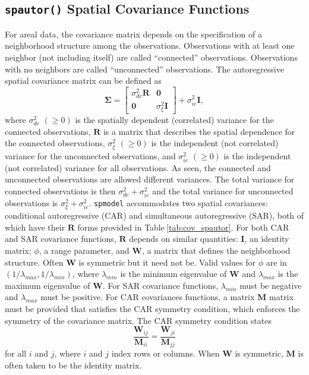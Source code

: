 \documentclass{article}
\begin{document}
\hypertarget{spautor-spatial-covariance-functions}{%
\subsection{\texorpdfstring{\texttt{spautor()} Spatial Covariance
Functions}{spautor() Spatial Covariance Functions}}\label{spautor-spatial-covariance-functions}}

For areal data, the covariance matrix depends on the specification of a
neighborhood structure among the observations. Observations with at
least one neighbor (not including itself) are called ``connected''
observations. Observations with no neighbors are called ``unconnected''
observations. The autoregressive spatial covariance matrix can be
defined as \begin{equation*}
  \boldsymbol{\Sigma} =
  \begin{bmatrix}
    \sigma^2_{de} \mathbf{R} & \mathbf{0} \\
    \mathbf{0} & \sigma^2_{\xi} \mathbf{I}
  \end{bmatrix}
  + \sigma^2_{ie} \mathbf{I},
\end{equation*} where \(\sigma^2_{de}\) \((\geq 0)\) is the spatially
dependent (correlated) variance for the connected observations,
\(\mathbf{R}\) is a matrix that describes the spatial dependence for the
connected observations, \(\sigma^2_{\xi}\) \((\geq 0)\) is the
independent (not correlated) variance for the unconnected observations,
and \(\sigma^2_{ie}\) \((\geq 0)\) is the independent (not correlated)
variance for all observations. As seen, the connected and unconnected
observations are allowed different variances. The total variance for
connected observations is then \(\sigma^2_{de} + \sigma^2_{ie}\) and the
total variance for unconnected observations is
\(\sigma^2_{\xi} + \sigma^2_{ie}\). \texttt{spmodel} accommodates two
spatial covariances: conditional autoregressive (CAR) and simultaneous
autoregressive (SAR), both of which have their \(\mathbf{R}\) forms
provided in Table\(~\)\ref{tab:cov_spautor}. For both CAR and SAR
covariance functions, \(\mathbf{R}\) depends on similar quantities:
\(\mathbf{I}\), an identity matrix; \(\phi\), a range parameter, and
\(\mathbf{W}\), a matrix that defines the neighborhood structure. Often
\(\mathbf{W}\) is symmetric but it need not be. Valid values for
\(\phi\) are in \((1 / \lambda_{max}, 1 / \lambda_{min})\), where
\(\lambda_{min}\) is the minimum eigenvalue of \(\mathbf{W}\) and
\(\lambda_{max}\) is the maximum eigenvalue of \(\mathbf{W}\). For SAR
covariance functions, \(\lambda_{min}\) must be negative and
\(\lambda_{max}\) must be positive. For CAR covariances functions, a
matrix \(\mathbf{M}\) matrix must be provided that satisfies the CAR
symmetry condition, which enforces the symmetry of the covariance
matrix. The CAR symmetry condition states \begin{equation*}
  \frac{\mathbf{W}_{ij}}{\mathbf{M}_{ii}} = \frac{\mathbf{W}_{ji}}{\mathbf{M}_{jj}}
\end{equation*} for all \(i\) and \(j\), where \(i\) and \(j\) index
rows or columns. When \(\mathbf{W}\) is symmetric, \(\mathbf{M}\) is
often taken to be the identity matrix.
\end{document}
